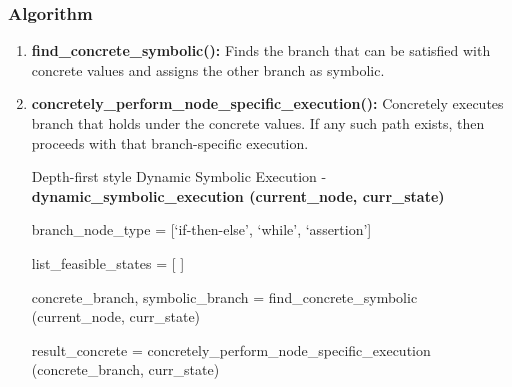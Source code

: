 \documentclass[11pt]{llncs}
\begin{document}
		\vspace{-5mm}

		\subsubsection{Algorithm}

			\begin{enumerate}
				\vspace{-2mm}
				\item \textbf{find\_concrete\_symbolic():}  Finds the branch that can be satisfied with concrete values and assigns the other branch as symbolic.

				\item \textbf{concretely\_perform\_node\_specific\_execution():}  Concretely executes branch that holds under the concrete values. If any such path exists, then proceeds with that branch-specific execution.


				\begin{algorithm}[H]
					\caption{Depth-first style Dynamic Symbolic Execution -\\ \textbf{ dynamic\_symbolic\_execution (current\_node, curr\_state)}}  \label{algorithm_8}
					
					\DontPrintSemicolon
					\SetAlgoLined
					
					
					\;
					
					branch\_node\_type = [‘if-then-else’, ‘while’, ‘assertion’]
	               
					\vspace{1mm}
	
	              			list\_feasible\_states = [ ]
	
					\vspace{3mm}
					
					 {
						concrete\_branch, symbolic\_branch = find\_concrete\_symbolic (current\_node, curr\_state)
	
						\vspace{1mm}
		
				                     result\_concrete = concretely\_perform\_node\_specific\_execution (concrete\_branch, curr\_state)
	
}
\end{algorithm}
\end{enumerate}
\end{document}
